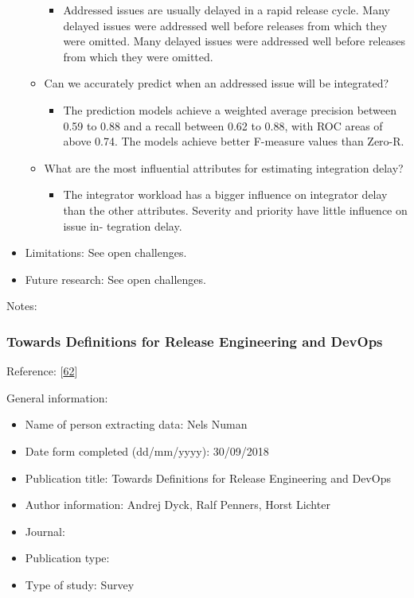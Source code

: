 \documentclass[]{book}
\providecommand{\tightlist}{%
  \setlength{\itemsep}{0pt}\setlength{\parskip}{0pt}}
\begin{document}
\begin{itemize}
\begin{itemize}
    \begin{itemize}
    \tightlist
    \item
      Addressed issues are usually delayed in a rapid release cycle.
      Many delayed issues were addressed well before releases from which
      they were omitted. Many delayed issues were addressed well before
      releases from which they were omitted.
    \end{itemize}
  \item
    Can we accurately predict when an addressed issue will be
    integrated?

    \begin{itemize}
    \tightlist
    \item
      The prediction models achieve a weighted average precision between
      0.59 to 0.88 and a recall between 0.62 to 0.88, with ROC areas of
      above 0.74. The models achieve better F-measure values than
      Zero-R.
    \end{itemize}
  \item
    What are the most influential attributes for estimating integration
    delay?

    \begin{itemize}
    \tightlist
    \item
      The integrator workload has a bigger influence on integrator delay
      than the other attributes. Severity and priority have little
      influence on issue in- tegration delay.
    \end{itemize}
  \end{itemize}
\item
  Limitations: See open challenges.
\item
  Future research: See open challenges.
\end{itemize}

Notes:

\subsubsection{Towards Definitions for Release Engineering and
DevOps}\label{towards-definitions-for-release-engineering-and-devops}

Reference: {[}\protect\hyperlink{ref-dyck2015a}{62}{]}

General information:

\begin{itemize}
\tightlist
\item
  Name of person extracting data: Nels Numan
\item
  Date form completed (dd/mm/yyyy): 30/09/2018
\item
  Publication title: Towards Definitions for Release Engineering and
  DevOps
\item
  Author information: Andrej Dyck, Ralf Penners, Horst Lichter
\item
  Journal:
\item
  Publication type:
\item
  Type of study: Survey
\end{itemize}
\end{document}
